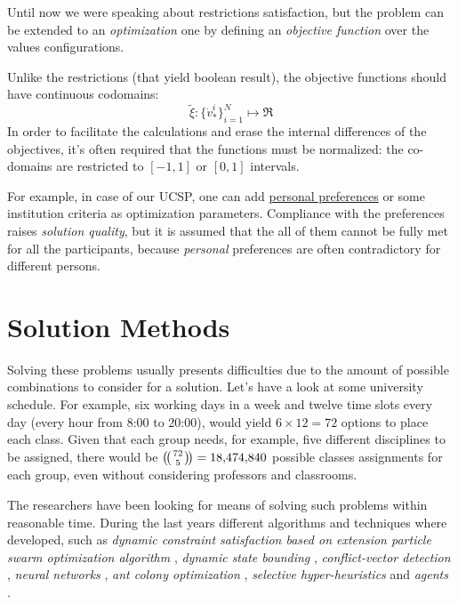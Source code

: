 \documentclass[ThesisDoc]{subfiles}
\begin{document}
\bigskip

  Until now we were speaking about restrictions satisfaction, but the problem can
be extended to an \emph{optimization} one by defining an
\emph{objective function} over the values configurations.

  Unlike the restrictions (that yield boolean result), the objective functions
should have continuous codomains:
$$\tilde\xi : \{{\dot v}^i_\ast\}_{i=1}^N \mapsto \Re$$
  In order to facilitate the calculations and erase the internal differences of
the objectives, it's often required that the functions must be normalized:
the co-domains are restricted to $[-1,1]$ or $[0,1]$ intervals.

  For example, in case of our UCSP,
one can add \underline{personal preferences} or some institution criteria as
optimization parameters.
  Compliance with the preferences raises \emph{solution quality},
but it is assumed that the all of them cannot be fully met for all the
participants, because \emph{personal} preferences are often
contradictory for different persons.

\section{Solution Methods}

  Solving these problems usually presents difficulties due to the amount of
possible combinations to consider for a solution. Let's have a look at
some university schedule.
  For example, six working days in a week and twelve time slots every day
(every hour from 8:00 to 20:00), would yield $6 \times 12 = 72$ options
to place each class.
  Given that each group needs, for example, five different disciplines to be assigned,
there would be $\multibinom{72}{5} = \num[group-separator={,}]{18474840}$
possible classes assignments for each group,
even without considering professors and classrooms.

\medskip
\noindent

  The researchers have been looking for means of solving such
problems within reasonable time.
  During the last years different algorithms and techniques where developed,
such as
\emph{dynamic constraint satisfaction based on extension particle swarm
      optimization algorithm} \cite{CSPswarm},
\emph{dynamic state bounding} \cite{CSPdynStateBound},
\emph{conflict-vector detection} \cite{CSPtimetable},
\emph{neural networks} \cite{CSPneuro},
\emph{ant colony optimization} \cite{CSPcunningACO, CSPlimmemACO},
\emph{selective hyper-heuristics} \cite{CSPhypHeur}
and \emph{agents} \cite{CSPagent2013, CSPagent2014, DCSPagent1998}.
\end{document}
